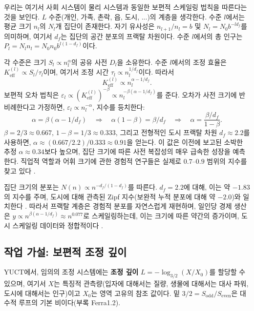 \documentclass[11pt,a4paper]{article}
\theoremstyle{remark}
\newcommand{\Keff}{K_{\mathrm{eff}}}
\begin{document}
	우리는 여기서 사회 시스템이 물리 시스템과 동일한 보편적 스케일링 법칙을 따른다는 것을 보인다. \(L\) 수준(개인, 가족, 촌락, 읍, 도시, ...)의 계층을 생각한다. 수준 \(l\)에서는 평균 크기 \(n_l\)의 \(N_l\)개 집단이 존재한다. 자기 유사성은 \(n_{l+1}/n_l = b\) 및 \(N_l = N_0 b^{-l d_f}\)를 의미하며, 여기서 \(d_f\)는 집단의 공간 분포의 프랙탈 차원이다. 수준 \(l\)에서의 총 인구는 \(P_l = N_l n_l = N_0 n_0 b^{l(1-d_f)}\)이다.
	
	각 수준은 크기 \(S_l \propto n_l^{\alpha}\)의 공유 사전 \(D_l\)을 소유한다. 수준 \(l\)에서의 조정 효율은 \(\Keff^{(l)} \propto S_l / \tau_l\)이며, 여기서 조정 시간 \(\tau_l \propto n_l^{1/d_f}\)이다. 따라서
	\begin{equation}
		\Keff^{(l)} \propto n_l^{\alpha - 1/d_f}. \tag{1}
	\end{equation}
	보편적 오차 법칙은 \(\varepsilon_l \propto (\Keff^{(l)})^{-\beta} \propto n_l^{-\beta(\alpha - 1/d_f)}\)를 준다. 오차가 사전 크기에 반비례한다고 가정하면, \(\varepsilon_l \propto n_l^{-\alpha}\), 지수를 등치한다:
	\begin{equation}
		\alpha = \beta(\alpha - 1/d_f) \quad\Longrightarrow\quad \alpha(1-\beta) = \beta / d_f \quad\Longrightarrow\quad \alpha = \frac{\beta / d_f}{1-\beta}.
	\end{equation}
	\(\beta = 2/3 \approx 0.667\), \(1-\beta = 1/3 \approx 0.333\), 그리고 전형적인 도시 프랙탈 차원 \(d_f \approx 2.2\)를 사용하면, \(\alpha \approx (0.667/2.2)/0.333 \approx 0.91\)을 얻는다. 이 값은 이전에 보고된 소박한 추정 \(\alpha \approx 0.34\)보다 높으며, 집단 크기에 따른 사전 복잡성의 매우 급속한 성장을 예측한다. 직업적 역할과 어휘 크기에 관한 경험적 연구들은 실제로 \(0.7\)–\(0.9\) 범위의 지수를 찾고 있다 \cite{Bettencourt2007, Molinero2024}.
	
	집단 크기의 분포는 \(N(n) \propto n^{-d_f/(1-d_f)}\)를 따른다. \(d_f = 2.2\)에 대해, 이는 약 \(-1.83\)의 지수를 주며, 도시에 대해 관측된 Zipf 지수(보완적 누적 분포에 대해 약 \(-2.0\))와 일치한다 \cite{Fluschnik2016, Rybski2023}. 따라서 프랙탈 계층은 경험적 분포를 자연스럽게 재현하며, 일인당 경제 생산은 \(y \propto n^{\beta(\alpha - 1/d_f)} \approx n^{0.077}\)로 스케일링하는데, 이는 크기에 따른 약간의 증가이며, 도시 스케일링 데이터와 정합적이다 \cite{Bettencourt2007}.
	
	\subsection{작업 가설: 보편적 조정 깊이}
	\label{sec:isomorphism}
	
	YUCT에서, 임의의 조정 시스템에는 \textbf{조정 깊이} \(L = -\log_{3/2}(X/X_0)\)를 할당할 수 있으며, 여기서 \(X\)는 특징적 관측량(입자에 대해서는 질량, 생물에 대해서는 대사 파워, 도시에 대해서는 인구)이고 \(X_0\)는 영역 고유의 참조 값이다. 밑 \(3/2 = S_{\mathrm{odd}}/S_{\mathrm{even}}\)은 대수적 루프의 기본 비이다(부록 Ferra1.2).
	
\end{document}
